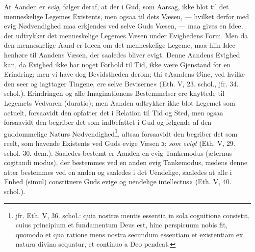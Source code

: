 \documentclass[12pt,a4paper]{book}
\newcommand{\opage}[1]{\marginnote{\footnotesize\textit{[#1]}}}
\begin{document}
At Aanden er \emph{evig}, følger deraf, at der i Gud, som
Aarsag, ikke blot til det menneskelige Legemes Existents,
\opage{168} \setcounter{footnote}{0}%
men ogsaa til dets Væsen, --- hvilket derfor med evig Nødvendighed
maa erkjendes ved selve Guds Væsen, --- maa
gives en Idee, der udtrykker det menneskelige Legemes
Væsen under Evighedens Form. Men da den menneskelige
Aand er Ideen om det menneskelige Legeme, maa hiin Idee
henhøre til Aandens Væsen, der saaledes bliver evigt. Denne
Aandens Evighed kan, da Evighed ikke har noget Forhold
til Tid, ikke være Gjenstand for en Erindring; men vi have
dog Bevidstheden derom; thi »Aandens Øine, ved hvilke den
seer og iagttager Tingene, ere selve Beviserne« (Eth. V,
23. schol., jfr. 34. schol.). Erindringen og alle Imaginationens
Bestemmelser ere knyttede til Legemets Vedvaren
(duratio); men Aanden udtrykker ikke blot Legemet som actuelt,
forsaavidt den opfatter det i Relation til Tid og Sted,
men ogsaa forsaavidt den begriber det som indbefattet i
Gud og følgende af den guddommelige Naturs Nødvendighed\footnote{jfr. Eth. V, 36. schol.: quia nostræ mentis essentia in sola cognitione consistit, cuius principium et fundamentum Deus est, hinc
perspicuum nobis fit, quomodo et qua ratione mens nostra secundum essentiam et existentiam ex natura divina sequatur, et continuo a Deo pendeat.}, altsaa forsaavidt den begriber det som reelt, som
havende Existents ved Guds evige Væsen ɔ: \emph{som evigt}
(Eth. V, 29. schol. 30. dem.). Saaledes bestemt er Aanden
en evig Tankemodus (æternus cogitandi modus), der bestemmes
ved en anden evig Tankemodus, medens denne
atter bestemmes ved en anden og saaledes i det Uendelige,
saaledes at alle i Enhed (simul) constituere Guds evige
og uendelige intellectus«%
 (Eth. V, 40. schol.).
\end{document}
